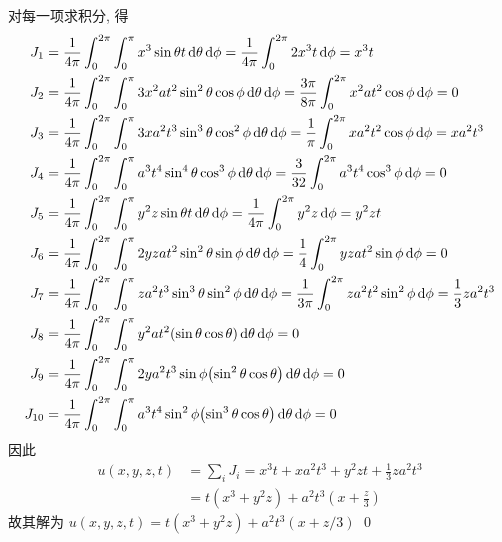 \begin{solution}
对每一项求积分, 得
\[ \begin{aligned}
J_1 &= \frac{1}{4\pi} \int_0^{2\pi} \int_0^\pi
    x^3 \sin\theta t
    \diff\theta \diff\phi 
    = \frac{1}{4\pi} \int_0^{2\pi} 2x^3t \diff\phi = x^3t \\
J_2 &= \frac{1}{4\pi} \int_0^{2\pi} \int_0^\pi
    3x^2 at^2\sin^2\theta \cos\phi
    \diff\theta \diff\phi 
    = \frac{3\pi}{8\pi} \int_0^{2\pi} x^2at^2 \cos\phi \diff\phi = 0 \\
J_3 &= \frac{1}{4\pi} \int_0^{2\pi} \int_0^\pi
    3x a^2t^3\sin^3\theta \cos^2\phi
    \diff\theta \diff\phi 
    = \frac{1}{\pi} \int_0^{2\pi} xa^2t^2 \cos\phi \diff\phi = xa^2t^3 \\
J_4 &= \frac{1}{4\pi} \int_0^{2\pi} \int_0^\pi
    a^3t^4\sin^4\theta \cos^3\phi
    \diff\theta \diff\phi 
    = \frac{3}{32} \int_0^{2\pi} a^3t^4 \cos^3\phi \diff\phi = 0 \\
J_5 &= \frac{1}{4\pi} \int_0^{2\pi} \int_0^\pi
    y^2z \sin\theta t
    \diff\theta \diff\phi 
    = \frac{1}{4\pi} \int_0^{2\pi} y^2z \diff\phi = y^2zt \\
J_6 &= \frac{1}{4\pi} \int_0^{2\pi} \int_0^\pi
    2yzat^2\sin^2\theta \sin\phi
    \diff\theta \diff\phi 
    = \frac{1}{4} \int_0^{2\pi} yzat^2 \sin\phi \diff\phi = 0 \\
J_7 &= \frac{1}{4\pi} \int_0^{2\pi} \int_0^\pi
    za^2t^3\sin^3\theta \sin^2\phi
    \diff\theta \diff\phi 
    = \frac{1}{3\pi} \int_0^{2\pi} za^2t^2 \sin^2\phi \diff\phi = \frac13za^2t^3 \\
J_8 &= \frac{1}{4\pi} \int_0^{2\pi} \int_0^\pi
    y^2at^2\mclosure{\sin\theta\cos\theta}
    \diff\theta \diff\phi = 0 \\
J_9 &= \frac{1}{4\pi} \int_0^{2\pi} \int_0^\pi
    2ya^2t^3 \sin\phi \mclosure{\sin^2\theta \cos\theta}
    \diff\theta \diff\phi = 0 \\
J_{10} &= \frac{1}{4\pi} \int_0^{2\pi} \int_0^\pi
    a^3t^4 \sin^2\phi \mclosure{\sin^3\theta \cos\theta}
    \diff\theta \diff\phi = 0 \\
\end{aligned} \]
因此
\[ \begin{aligned}
u(x, y, z, t) &= \sum_i J_i = x^3t + xa^2t^3 + y^2zt + \frac13za^2t^3 \\
&= t(x^3 + y^2z) + a^2t^3(x + \frac{z}{3})
\end{aligned} \]
故其解为 $u(x, y, z, t) = t(x^3 + y^2z) + a^2t^3(x + z/3)$
\qed
\end{solution}


